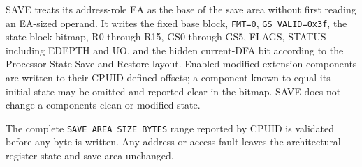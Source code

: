 SAVE treats its address-role EA as the base of the save area without first reading an EA-sized operand. It writes the fixed base block, \texttt{FMT=0}, \texttt{GS\_VALID=0x3f}, the state-block bitmap, R0 through R15, GS0 through GS5, FLAGS, STATUS including EDEPTH and UO, and the hidden current-DFA bit according to the Processor-State Save and Restore layout. Enabled modified extension components are written to their CPUID-defined offsets; a component known to equal its initial state may be omitted and reported clear in the bitmap. SAVE does not change a component\textquotesingle{}s clean or modified state.

The complete \texttt{SAVE\_AREA\_SIZE\_BYTES} range reported by CPUID is validated before any byte is written. Any address or access fault leaves the architectural register state and save area unchanged.

